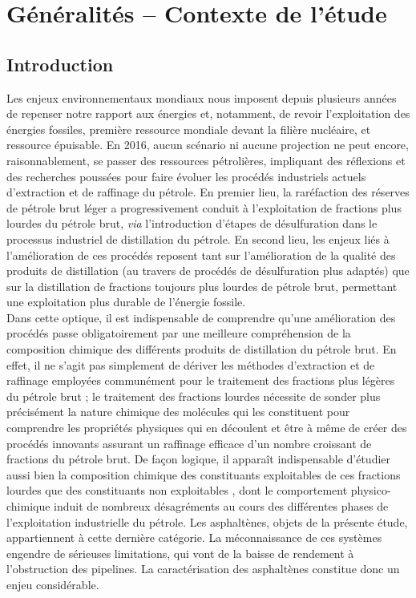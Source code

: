 \chapter{Généralités -- Contexte de l'étude}
\minitoc
\restoregeometry

\newpage	
	\section*{Introduction}
	
Les enjeux environnementaux mondiaux nous imposent depuis plusieurs années de repenser notre rapport aux énergies et, notamment, de revoir l'exploitation des énergies fossiles, première ressource mondiale devant la filière nucléaire, et ressource épuisable. En 2016, aucun scénario ni aucune projection ne peut encore, raisonnablement, se passer des ressources pétrolières, impliquant des réflexions et des recherches poussées pour faire évoluer les procédés industriels actuels d'extraction et de raffinage du pétrole. En premier lieu, la raréfaction des réserves de pétrole brut léger a progressivement conduit à l'exploitation de fractions plus lourdes du pétrole brut, \textit{via} l'introduction d'étapes de désulfuration dans le processus industriel de distillation du pétrole. En second lieu, les enjeux liés à l'amélioration de ces procédés reposent tant sur l'amélioration de la qualité des produits de distillation (au travers de procédés de désulfuration plus adaptés) que sur la distillation de fractions toujours plus lourdes de pétrole brut, permettant une exploitation plus durable de l'énergie fossile.\\

Dans cette optique, il est indispensable de comprendre qu'une amélioration des procédés passe obligatoirement par une meilleure compréhension de la composition chimique des différents produits de distillation du pétrole brut. En effet, il ne s'agit pas simplement de dériver les méthodes d'extraction et de raffinage employées communément pour le traitement des fractions plus légères du pétrole brut ; le traitement des fractions lourdes nécessite de sonder plus précisément la nature chimique des molécules qui les constituent pour comprendre les propriétés physiques qui en découlent et être à même de créer des procédés innovants assurant un raffinage efficace d'un nombre croissant de fractions du pétrole brut. De façon logique, il apparaît indispensable d'étudier aussi bien la composition chimique des constituants \og exploitables\fg{} de ces fractions lourdes que des constituants \og non exploitables \fg, dont le comportement physico-chimique induit de nombreux désagréments au cours des différentes phases de l'exploitation industrielle du pétrole. Les asphaltènes, objets de la présente étude, appartiennent à cette dernière catégorie. La méconnaissance de ces systèmes engendre de sérieuses limitations, qui vont de la baisse de rendement à l'obstruction des pipelines. La caractérisation des asphaltènes constitue donc un enjeu considérable.\\ 

